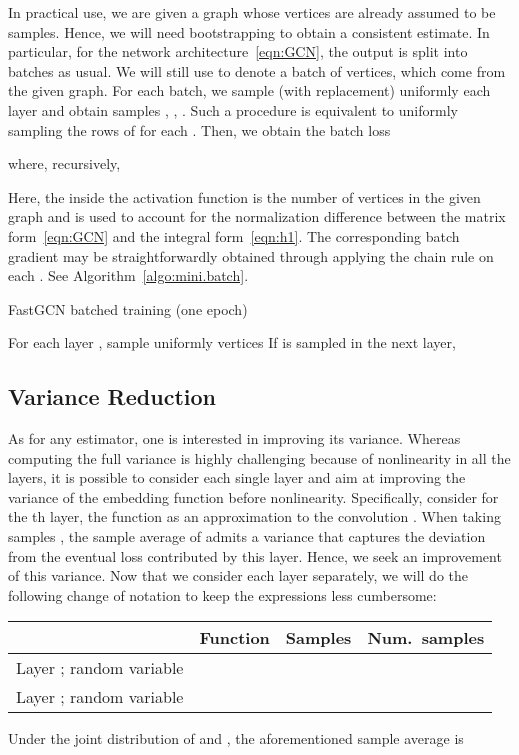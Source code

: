 \documentclass{article} \usepackage{iclr2018_conference,times}
\theoremstyle{plain}\newtheorem{theorem}{Theorem}\theoremstyle{plain}\newtheorem{proposition}[theorem]{Proposition}
\theoremstyle{plain}\newtheorem{corollary}[theorem]{Corollary}
\theoremstyle{plain}\newtheorem{lemma}[theorem]{Lemma}
\begin{document}
In practical use, we are given a graph whose vertices are already assumed to be samples. Hence, we will need bootstrapping to obtain a consistent estimate. In particular, for the network architecture~\eqref{eqn:GCN}, the output  is split into batches as usual. We will still use  to denote a batch of vertices, which come from the given graph. For each batch, we sample (with replacement) uniformly each layer and obtain samples , , . Such a procedure is equivalent to uniformly sampling the rows of  for each . Then, we obtain the batch loss

where, recursively,

Here, the  inside the activation function  is the number of vertices in the given graph and is used to account for the normalization difference between the matrix form~\eqref{eqn:GCN} and the integral form~\eqref{eqn:h1}. The corresponding batch gradient may be straightforwardly obtained through applying the chain rule on each . See Algorithm~\ref{algo:mini.batch}.

\begin{algorithm}[ht]
  \caption{FastGCN batched training (one epoch)}
  \label{algo:mini.batch}
  \begin{algorithmic}[1]
    \State For each layer , sample uniformly  vertices 
     
    \State If  is sampled in the next layer, 
    \EndFor
    \State 
    \EndFor
  \end{algorithmic}
\end{algorithm}


\subsection{Variance Reduction}
As for any estimator, one is interested in improving its variance. Whereas computing the full variance is highly challenging because of nonlinearity in all the layers, it is possible to consider each single layer and aim at improving the variance of the embedding function before nonlinearity. Specifically, consider for the th layer, the function  as an approximation to the convolution . When taking  samples , the sample average of  admits a variance that captures the deviation from the eventual loss contributed by this layer. Hence, we seek an improvement of this variance. Now that we consider each layer separately, we will do the following change of notation to keep the expressions less cumbersome:
\begin{center}
\renewcommand*{\arraystretch}{1.5}
\begin{tabular}{cccc}
\hline
& Function & Samples & Num.\ samples \\
\hline
Layer ; random variable  &
 &
 &
 \\
Layer ; random variable  &
 &
 &
 \\
\hline
\end{tabular}
\end{center}
Under the joint distribution of  and , the aforementioned sample average is
\end{document}
